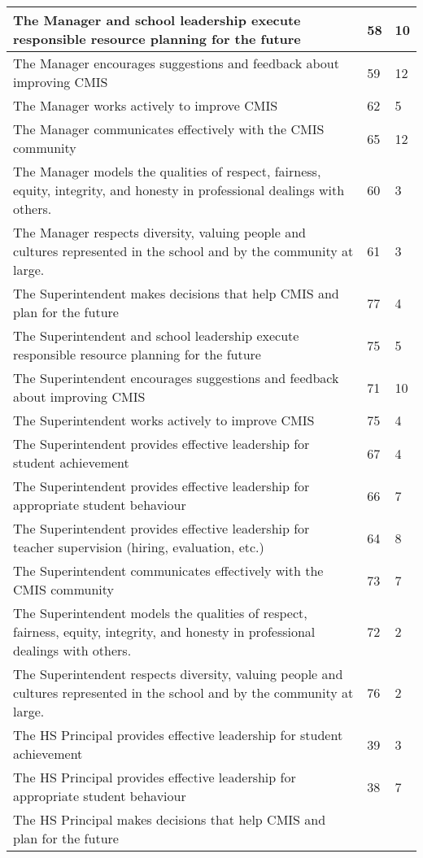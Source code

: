 \begin{table}[H]
\begin{longtabu}{|X[8]|X|X|}
\hline
The Manager and school leadership execute responsible resource planning for the future &
58 &
10 \\
\hline
The Manager encourages suggestions and feedback about improving CMIS &
59 &
12 \\
\hline
The Manager works actively to improve CMIS &
62 &
5 \\
\hline
The Manager communicates effectively with the CMIS community &
65 &
12 \\
\hline
The Manager models the qualities of respect, fairness, equity, integrity, and honesty in professional dealings with others. &
60 &
3 \\
\hline
The Manager respects diversity, valuing people and cultures represented in the school and by the community at large. &
61 &
3 \\
\hline
The Superintendent makes decisions that help CMIS and plan for the future &
77 &
4 \\
\hline
The Superintendent and school leadership execute responsible resource planning for the future &
75 &
5 \\
\hline
The Superintendent encourages suggestions and feedback about improving CMIS &
71 &
10 \\
\hline
The Superintendent works actively to improve CMIS &
75 &
4 \\
\hline
The Superintendent provides effective leadership for student achievement &
67 &
4 \\
\hline
The Superintendent provides effective leadership for appropriate student behaviour &
66 &
7 \\
\hline
The Superintendent provides effective leadership for teacher supervision (hiring, evaluation, etc.) &
64 &
8 \\
\hline
The Superintendent communicates effectively with the CMIS community &
73 &
7 \\
\hline
The Superintendent models the qualities of respect, fairness, equity, integrity, and honesty in professional dealings with others. &
72 &
2 \\
\hline
The Superintendent respects diversity, valuing people and cultures represented in the school and by the community at large. &
76 &
2 \\
\hline
The HS Principal provides effective leadership for student achievement &
39 &
3 \\
\hline
The HS Principal provides effective leadership for appropriate student behaviour &
38 &
7 \\
\hline
The HS Principal makes decisions that help CMIS and plan for the future &

\end{longtabu}
\end{table}

